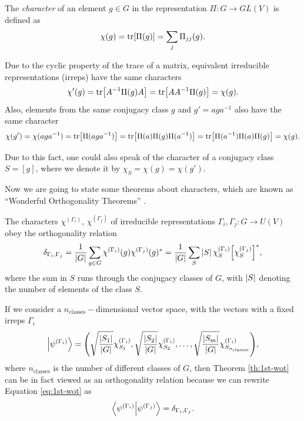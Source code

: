 \begin{definition}
The \textit{character} of an element $g \in G$ in the representation $\Pi: G \to GL(V)$ is defined as
\begin{equation} \label{eq:character}
\chi(g) = \tr[\Pi(g)] = \sum_{j} \Pi_{jj}(g).
\end{equation}
\end{definition}
Due to the cyclic property of the trace of a matrix, equivalent irreducible representations (irreps) have the same characters
$$
\chi'(g) = \tr[A^{-1} \Pi(g) A] =  \tr[AA^{-1} \Pi(g)] = \chi(g).
$$
Also, elements from the same conjugacy class $g$ and $g' = a g a^{-1}$ also have the same character
$$
\chi(g') = \chi(aga^{-1}) = \tr[\Pi(aga^{-1})] = \tr[\Pi(a)\Pi(g)\Pi(a^{-1})] = \tr[\Pi(a^{-1})\Pi(a)\Pi(g)] = \chi(g).
$$

Due to this fact, one could also speak of the character of a conjugacy class $S = [g]$, where we denote it by $\chi_S = \chi(g) = \chi(g')$.

Now we are going to state some theorems about characters, which are known as ``Wonderful Orthogonality Theorems'' \cite{dresselhaus, hamermesh}.

\begin{theorem} \label{th:1st-wot}
The characters $\chi^{(\Gamma_i)}$, $\chi^{(\Gamma_j)}$ of irreducible representations $\Gamma_i, \Gamma_j: G \to U(V)$ obey the orthogonality relation
\begin{equation} \label{eq:1st-wot}
\delta_{\Gamma_i, \Gamma_j} =
\frac{1}{\abs{G}} \sum_{g \in G} \chi^{(\Gamma_i)}(g) \chi^{(\Gamma_j)}(g)^* =
\frac{1}{\abs{G}} \sum_{S} \abs{S} \, \chi^{(\Gamma_i)}_S \qty[\chi^{(\Gamma_j)}_S]^*,
\end{equation}
where the sum in $S$ runs through the conjugacy classes of $G$, with $\abs{S}$ denoting the number of elements of the class $S$.
\end{theorem}

If we consider a $n_{\text{classes}} -$dimensional vector space, with the vectors with a fixed irreps $\Gamma_i$
$$
\ket{\psi^{(\Gamma_i)}} =
\qty(
\sqrt{\frac{\abs{S_1}}{\abs{G}}} \chi^{(\Gamma_i)}_{S_1},
\sqrt{\frac{\abs{S_2}}{\abs{G}}} \chi^{(\Gamma_i)}_{S_2},
\ldots,
\sqrt{\frac{\abs{S_m}}{\abs{G}}} \chi^{(\Gamma_i)}_{S_{n_{\text{classes}}}}
),
$$
where $n_{\text{classes}}$ is the number of different classes of $G$, then Theorem \ref{th:1st-wot} can be in fact viewed as an orthogonality relation because we can rewrite Equation \ref{eq:1st-wot} as
\begin{equation} \label{eq:orthog_irreps}
\braket{\psi^{(\Gamma_i)}}{\psi^{(\Gamma_j)}} = \delta_{\Gamma_i, \Gamma_j}.
\end{equation}

